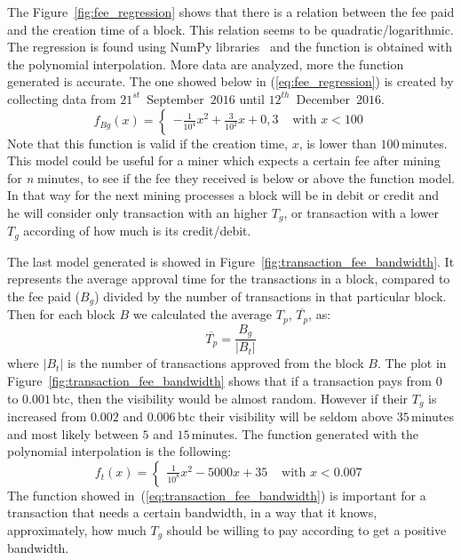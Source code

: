 \documentclass[USenglish]{uit-thesis}
\begin{document}
The Figure~\ref{fig:fee_regression} shows that there is a relation between the fee paid
and the creation time of a block. This relation seems to be quadratic/logarithmic.
The regression is found using NumPy libraries~\cite{scipy} and the function is obtained
with the polynomial interpolation. More data are analyzed, more the function
generated is accurate. The one showed below in (\ref{eq:fee_regression}) is created
by collecting data from  $21^{st}$~September~$2016$ until $12^{th}$~December~$2016$. 
\begin{equation}
\label{eq:fee_regression}
f_{Bg}(x) =  \begin{cases}-\frac{1}{10^4}x^2 + \frac{3}{10^2}x + 0,3 & \mbox{ with } x < 100 \end{cases}
\end{equation}
Note that this function is valid if the creation time, $x$, is
lower than $100$\,minutes.
This model could be useful for a miner which expects a certain fee after mining for \emph{n}
minutes, to see if the fee they received is below or above the function model. In that way for the next
mining processes a block will be in debit or credit and he will consider only transaction with an higher
$T_g$, or transaction with a lower $T_g$ according of how much is its credit/debit.

The last model generated is showed in Figure~\ref{fig:transaction_fee_bandwidth}. It
represents the average approval time for the transactions in a block, compared to
the fee paid ($B_g$) divided by the number of transactions in that particular block.
Then for each block $B$ we calculated the average $T_p$, $\overline{T_p}$, as:
\begin{equation}
\label{eq:transaction_fee}
\overline{T_p} = \frac{B_g}{|B_t|} 
\end{equation}
where $|B_t|$ is the number of transactions approved from the block $B$.
The plot in Figure~\ref{fig:transaction_fee_bandwidth} shows that if a transaction
pays from $0$ to $0.001$\,\gls{btc}, then the visibility would be almost random.
However if their $T_g$ is increased from $0.002$ and $0.006$\,\gls{btc} their
visibility will be seldom above $35$\,minutes and most likely between $5$ and $15$\,minutes.
The function generated with the polynomial interpolation is the following:
\begin{equation}
\label{eq:transaction_fee_bandwidth}
f_t(x) = \begin{cases}\frac{1}{10^8}x^2 - 5000x + 35 & \mbox{ with } x < 0.007\end{cases}
\end{equation}
The function showed in~(\ref{eq:transaction_fee_bandwidth}) is important
for a transaction that needs a certain bandwidth, in a way that it knows, approximately, how much
$T_g$ should be willing to pay according to get a positive bandwidth.
\end{document}
